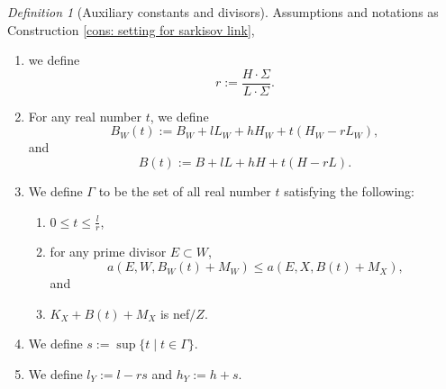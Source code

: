 \documentclass[11pt]{amsart}
\numberwithin{equation}{section}
\newcommand{\Ii}{{\Gamma}}
\theoremstyle{definition}
\theoremstyle{remark}
\newtheorem{defn}[thm]{Definition}
\theoremstyle{definition}
\begin{document}
\begin{defn}[Auxiliary constants and divisors]\label{defn: auxiliary invariants}
Assumptions and notations as Construction \ref{cons: setting for sarkisov link},
\begin{enumerate}
    \item we define $$r:=\frac{H\cdot\Sigma}{L\cdot\Sigma}.$$
    \item For any real number $t$, we define
    $$B_W(t):=B_W+lL_W+hH_W+t(H_W-rL_W),$$ 
and 
$$B(t):=B+lL+hH+t(H-rL).$$
\item We define $\Ii$ to be the set of all real number $t$ satisfying the following:
\begin{enumerate}
    \item $0\leq t\leq\frac{l}{r}$,
        \item for any prime divisor $E\subset W$,
    $$a(E,W,B_W(t)+M_W)\leq a(E,X,B(t)+M_X),$$
    and
    \item $K_X+B(t)+M_X$ is nef$/Z$.
\end{enumerate}
\item We define $s:=\sup\{t\mid t\in\Ii\}$.
\item We define $l_Y:=l-rs$ and $h_Y:=h+s$.
\end{enumerate}
\end{defn}
\end{document}
